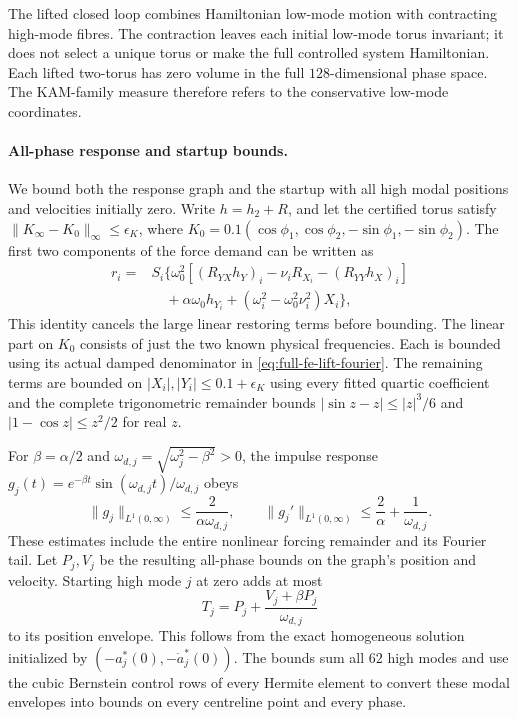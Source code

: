 The lifted closed loop combines Hamiltonian low-mode motion with
contracting high-mode fibres. The contraction leaves each initial low-mode
torus invariant; it does not select a unique torus or make the full
controlled system Hamiltonian. Each lifted two-torus has zero volume in
the full $128$-dimensional phase space. The KAM-family measure therefore
refers to the conservative low-mode coordinates.

\paragraph{All-phase response and startup bounds.}
We bound both the response graph and the startup
with all high modal positions and velocities initially zero. Write
$h=h_2+R$, and let the certified torus satisfy
$\|K_\infty-K_0\|_\infty\leq\epsilon_K$, where
$K_0=0.1(\cos\phi_1,\cos\phi_2,-\sin\phi_1,-\sin\phi_2)$.
The first two components of the force demand can be written as
\begin{align}
 r_i={}&S_i\bigl\{\omega_0^2[
 (R_{YX}h_Y)_i-\nu_iR_{X_i}-(R_{YY}h_X)_i]\nonumber\\
 &\quad+\alpha\omega_0h_{Y_i}
 +(\omega_i^2-\omega_0^2\nu_i^2)X_i\bigr\},
 \label{eq:full-fe-small-force}
\end{align}
This identity cancels the large linear restoring terms before bounding.
The linear part on $K_0$ consists of just the two known physical
frequencies. Each is bounded using its actual damped denominator in
\eqref{eq:full-fe-lift-fourier}. The remaining terms are bounded on
$|X_i|,|Y_i|\leq0.1+\epsilon_K$ using every fitted quartic coefficient and
the complete trigonometric remainder bounds
$|\sin z-z|\leq|z|^3/6$ and $|1-\cos z|\leq z^2/2$ for real $z$.

For $\beta=\alpha/2$ and
$\omega_{d,j}=\sqrt{\omega_j^2-\beta^2}>0$, the impulse response
$g_j(t)=e^{-\beta t}\sin(\omega_{d,j}t)/\omega_{d,j}$ obeys
\begin{equation}
 \|g_j\|_{L^1(0,\infty)}\leq\frac{2}{\alpha\omega_{d,j}},
 \qquad
 \|g_j'\|_{L^1(0,\infty)}\leq\frac2\alpha+\frac1{\omega_{d,j}}.
 \label{eq:full-fe-green-bounds}
\end{equation}
These estimates include the entire nonlinear forcing remainder and its
Fourier tail. Let $P_j,V_j$ be the resulting all-phase
bounds on the graph's position and velocity. Starting high mode $j$ at
zero adds at most
\begin{equation}
 T_j=P_j+\frac{V_j+\beta P_j}{\omega_{d,j}}
 \label{eq:full-fe-transient}
\end{equation}
to its position envelope. This follows from the exact homogeneous
solution initialized by $(-a_j^*(0),-\dot a_j^*(0))$.
The bounds sum all $62$ high modes and use the cubic Bernstein
control rows of every Hermite element to convert these modal envelopes
into bounds on every centreline point and every phase.

